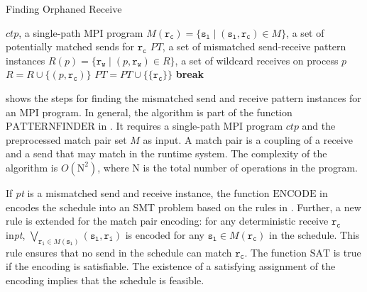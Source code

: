 \begin{algorithm}
\caption{Finding Orphaned Receive}\label{algo:mismatch}
\begin{algorithmic}[1]
\Require $\mathit{ctp}$, a single-path MPI program
\Require $\mathit{M}(\mathtt{r_c}) = \{\mathtt{s_l}\mid(\mathtt{s_l},\mathtt{r_c})\in\mathit{M}\}$, a set of potentially matched sends for $\mathtt{r_c}$
\State $\mathit{PT}$, a set of mismatched send-receive pattern instances
\State $\mathit{R}(p) = \{\mathtt{r_w}\mid(p,\mathtt{r_w})\in\mathit{R}\}$, a set of wildcard receives on process $p$
\State $\mathit{R} = \mathit{R} \cup \{(p,\mathtt{r_c})\}$
\EndIf
{}
\State $\mathit{PT} = \mathit{PT} \cup \{\{\mathtt{r_c}\}\}$
\State \textbf{break}
\EndIf
\EndFor
\EndIf
\EndFor
\EndFor
\end{algorithmic}
\end{algorithm}

 shows the steps for finding the mismatched send and receive pattern instances for an MPI program. In general, the algorithm is part of the function $\mathrm{PATTERNFINDER}$ in . It requires a single-path MPI program $\mathit{ctp}$ and the preprocessed match pair set $\mathit{M}$ as input. A match pair is a coupling of a receive and a send that may match in the runtime system. The complexity of the algorithm is $O(\mathrm{N}^2)$, where $\mathrm{N}$ is the total number of operations in the program. 



 If \textit{pt} is a mismatched send and receive instance, the function $\mathrm{ENCODE}$ in  encodes the schedule into an SMT problem based on the rules in \cite{DBLP:conf/kbse/HuangMM13}. Further, a new rule is extended for the match pair encoding: for any deterministic receive $\mathtt{r_c}$ in\textit{pt}, $\bigvee_{\mathtt{r_i}\in\mathit{M}(\mathtt{s_l})}(\mathtt{s_l},\mathtt{r_i})$ is encoded for any $\mathtt{s_l}\in\mathit{M}(\mathtt{r_c})$ in the schedule. This rule ensures that no send in the schedule can match $\mathtt{r_c}$. The function $\mathrm{SAT}$ is true if the encoding is satisfiable. The existence of a satisfying assignment of the encoding implies that the schedule is feasible. 

